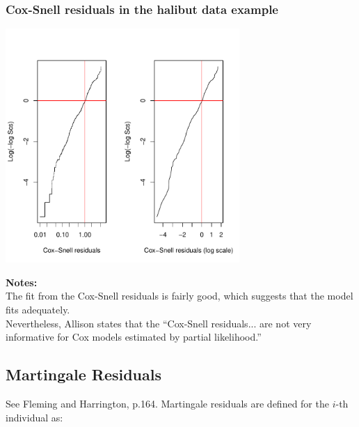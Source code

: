 \documentclass[11pt]{book}
\begin{document}
\subsubsection{Cox-Snell residuals in the halibut data example}
\centerline{\includegraphics[width=3.5in]{coxsnell.pdf}}
{\bf Notes:}\\[2ex]
The fit from the Cox-Snell residuals is fairly good, which suggests that the model fits adequately.\\[2ex]
Nevertheless, Allison states that the ``Cox-Snell residuals...  are not very informative
for Cox models estimated by partial likelihood.''
\subsection{Martingale Residuals}
See Fleming and Harrington, p.164. Martingale residuals are defined for the $i$-th individual as:
\end{document}
